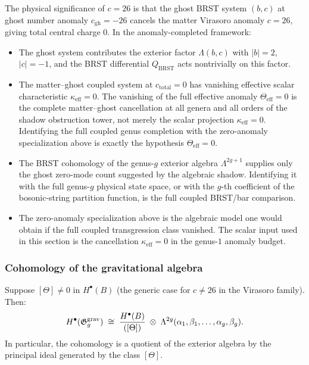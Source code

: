 \begin{remark}[Comparison with BRST cohomology at $c = 26$]
The physical significance of $c = 26$ is that the ghost
BRST system $(b, c)$ at ghost number anomaly
$c_{\mathrm{gh}} = -26$ cancels the matter Virasoro anomaly
$c = 26$, giving total central charge $0$.
In the anomaly-completed framework:
\begin{itemize}
\item The ghost system contributes the exterior factor
 $\Lambda(b, c)$ with $|b| = 2$, $|c| = -1$, and the
 BRST differential $Q_{\mathrm{BRST}}$ acts nontrivially
 on this factor.
\item The matter--ghost coupled system at $c_{\mathrm{total}} = 0$
 has vanishing effective scalar characteristic
 $\kappa_{\mathrm{eff}} = 0$. The vanishing of the full effective
 anomaly $\Theta_{\mathrm{eff}} = 0$ is the complete
 matter--ghost cancellation at all genera and all orders of the
 shadow obstruction tower, not merely the scalar projection
 $\kappa_{\mathrm{eff}} = 0$. Identifying the full coupled genus
 completion with the zero-anomaly specialization above is exactly the
 hypothesis $\Theta_{\mathrm{eff}} = 0$.
\item The BRST cohomology of the genus-$g$ exterior algebra
 $\Lambda^{2g+1}$ supplies only the ghost zero-mode count
 suggested by the algebraic shadow. Identifying it with the
 full genus-$g$ physical state space, or with the $g$-th
 coefficient of the bosonic-string partition function, is the full
 coupled BRST/bar comparison.
\item The zero-anomaly specialization above is the algebraic model
 one would obtain if the full coupled transgression class vanished.
 The scalar input used in this section is the cancellation
 $\kappa_{\mathrm{eff}}=0$ in the genus-$1$ anomaly budget.
\end{itemize}
\end{remark}

\subsubsection{Cohomology of the gravitational algebra}

\begin{proposition}
Suppose $[\Theta] \neq 0$ in $H^\bullet(B)$
(the generic case for $c \neq 26$ in the Virasoro family).
Then:
\[
H^\bullet(\mathfrak{G}_g^{\mathrm{grav}})
\;\cong\;
\frac{H^\bullet(B)}{([\Theta])}
\;\otimes\;
\Lambda^{2g}(\alpha_1,\beta_1,\dots,\alpha_g,\beta_g).
\]
In particular, the cohomology is a quotient of the
exterior algebra by the principal ideal generated by the
class $[\Theta]$.
\end{proposition}

